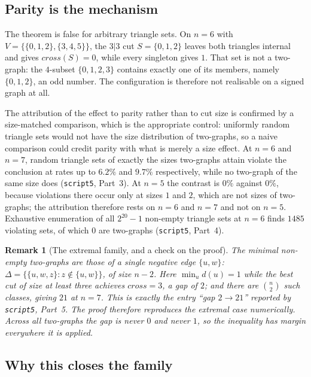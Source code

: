 \documentclass[11pt,a4paper]{article}
\def\mathrm#1{#1}%
\def\mathcal#1{#1}%
\newtheorem{remark}[theorem]{Remark}
\newcommand{\cross}{\mathrm{cross}}
\newcommand{\dtg}{d}
\begin{document}
\subsection{Parity is the mechanism}

The theorem is false for arbitrary triangle sets. On $n=6$ with $\mathcal{V}=\{\{0,1,2\},\{3,4,5\}\}$, the $3|3$ cut $S=\{0,1,2\}$ leaves both triangles internal and gives $\cross(S)=0$, while every singleton gives $1$. That set is not a two-graph: the $4$-subset $\{0,1,2,3\}$ contains exactly one of its members, namely $\{0,1,2\}$, an odd number. The configuration is therefore not realisable on a signed graph at all.

The attribution of the effect to parity rather than to cut size is confirmed by a size-matched comparison, which is the appropriate control: uniformly random triangle sets would not have the size distribution of two-graphs, so a naive comparison could credit parity with what is merely a size effect. At $n=6$ and $n=7$, random triangle sets of exactly the sizes two-graphs attain violate the conclusion at rates up to $6.2\%$ and $9.7\%$ respectively, while no two-graph of the same size does (\texttt{script5}, Part~3). At $n=5$ the contrast is $0\%$ against $0\%$, because violations there occur only at sizes $1$ and $2$, which are not sizes of two-graphs; the attribution therefore rests on $n=6$ and $n=7$ and not on $n=5$. Exhaustive enumeration of all $2^{20}-1$ non-empty triangle sets at $n=6$ finds $1485$ violating sets, of which $0$ are two-graphs (\texttt{script5}, Part~4).

\begin{remark}[The extremal family, and a check on the proof]
\label{rem:extremal}
The minimal non-empty two-graphs are those of a single negative edge $\{u,w\}$: $\Delta=\{\{u,w,z\}:z\notin\{u,w\}\}$, of size $n-2$. Here $\min_u\dtg(u)=1$ while the best cut of size at least three achieves $\cross=3$, a gap of $2$; and there are $\binom{n}{2}$ such classes, giving $21$ at $n=7$. This is exactly the entry ``gap $2\to21$'' reported by \texttt{script5}, Part~5. The proof therefore reproduces the extremal case numerically. Across all two-graphs the gap is never $0$ and never $1$, so the inequality has margin everywhere it is applied.
\end{remark}

\subsection{Why this closes the family}
\end{document}
